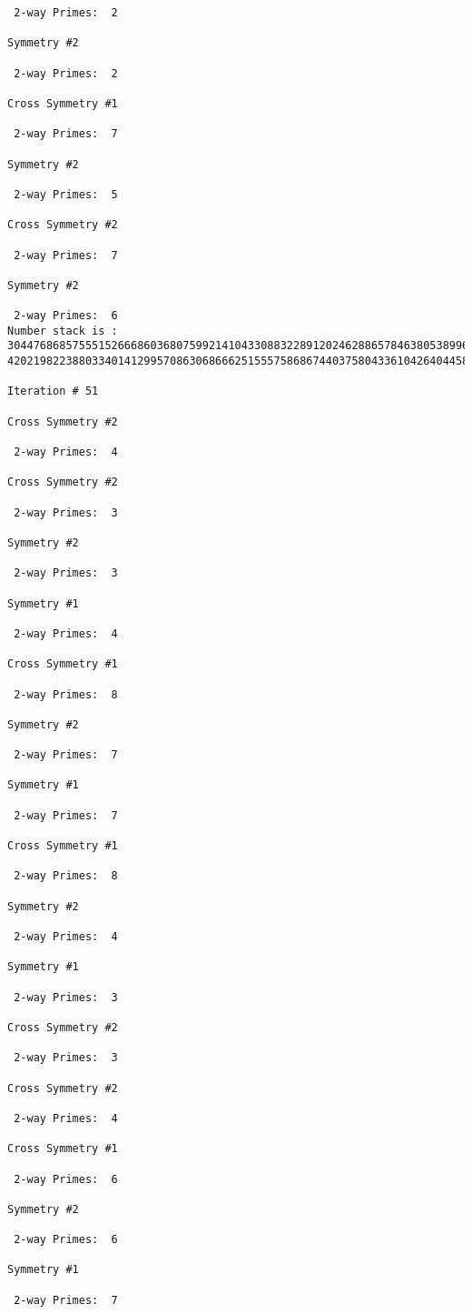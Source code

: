 \begin{verbatim}
 2-way Primes: 	2

Symmetry #2

 2-way Primes: 	2

Cross Symmetry #1

 2-way Primes: 	7

Symmetry #2

 2-way Primes: 	5

Cross Symmetry #2

 2-way Primes: 	7

Symmetry #2

 2-way Primes: 	6
Number stack is :
30447686857555152666860368075992141043308832289120246288657846380538996794608835958544046240163340857
42021982238803340141299570863068666251555758686744037580433610426404458595388064976998350836487568826

Iteration #	51

Cross Symmetry #2

 2-way Primes: 	4

Cross Symmetry #2

 2-way Primes: 	3

Symmetry #2

 2-way Primes: 	3

Symmetry #1

 2-way Primes: 	4

Cross Symmetry #1

 2-way Primes: 	8

Symmetry #2

 2-way Primes: 	7

Symmetry #1

 2-way Primes: 	7

Cross Symmetry #1

 2-way Primes: 	8

Symmetry #2

 2-way Primes: 	4

Symmetry #1

 2-way Primes: 	3

Cross Symmetry #2

 2-way Primes: 	3

Cross Symmetry #2

 2-way Primes: 	4

Cross Symmetry #1

 2-way Primes: 	6

Symmetry #2

 2-way Primes: 	6

Symmetry #1

 2-way Primes: 	7


\end{verbatim}
